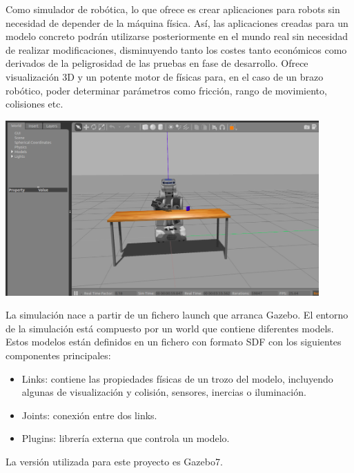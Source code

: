 \documentclass[12pt,spanish,chapterprefix, numbers=noenddot]{book}
\numberwithin{equation}{section}
\numberwithin{figure}{section}
\begin{document}
Como simulador de robótica, lo que ofrece es crear aplicaciones para robots sin necesidad de depender de la máquina física. Así, las aplicaciones creadas para un modelo concreto podrán utilizarse posteriormente en el mundo real sin necesidad de realizar modificaciones, disminuyendo tanto los costes tanto económicos como derivados de la peligrosidad de las pruebas en fase de desarrollo.
Ofrece visualización 3D y un potente motor de físicas para, en el caso de un brazo robótico, poder determinar parámetros como fricción, rango de movimiento, colisiones etc.
\begin{center}
\includegraphics[width=12cm]{Figs/GazeboWorld_PR2.png}
\end{center}
La simulación nace a partir de un fichero launch que arranca Gazebo. El entorno de la simulación está compuesto por un world que contiene diferentes models. Estos modelos están definidos en un fichero con formato SDF con los siguientes componentes principales:
\begin{itemize}
\item Links: contiene las propiedades físicas de un trozo del modelo, incluyendo algunas de visualización y colisión, sensores, inercias o iluminación.
\item Joints: conexión entre dos links.
\item Plugins: librería externa que controla un modelo. 
\end{itemize}
La versión utilizada para este proyecto es Gazebo7.
\end{document}
